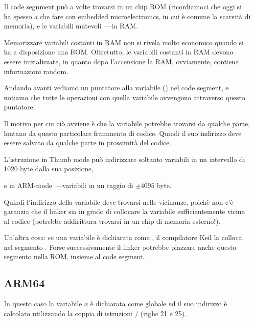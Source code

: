 Il code segnment può a volte trovarsi in un chip \ac{ROM} (ricordiamoci che oggi si ha spesso a che fare con embedded microelectronics, in cui è comune la scarsità di memoria), e le variabili mutevoli~---in \ac{RAM}.

Memorizzare variabili costanti in RAM non si rivela molto economico quando si ha a disposizione una ROM.
Oltretutto, le variabili costanti in RAM devono essere inizializzate, in quanto dopo l'accensione la RAM, ovviamente, contiene informazioni random.


Andando avanti vediamo un puntatore alla variabile  () nel code segment, e notiamo che tutte le operazioni con quella variabile avvengono attraverso questo puntatore.

Il motivo per cui ciò avviene è che la variabile  potrebbe trovarsi da qualche parte, lontano da questo particolare frammento di codice. Quindi il suo indirizzo deve essere salvato da qualche parte in prossimità del codice.

L'istruzione  in Thumb mode può indirizzare soltanto variabili in un intervallo di 1020 byte dalla sua posizione, 

e in ARM-mode~---variabili in un raggio di $\pm{}4095$ byte.

Quindi l'indirizzo della variabile  deve trovarsi nelle vicinanze, poichè non c'è garanzia che il linker sia in grado di collocare la variabile sufficientemente vicina al codice (potrebbe addirittura trovarsi in un chip di memoria esterno!).

\myindex{\ROM}

Un'altra cosa: se una variabile è dichiarata come , il compilatore Keil la colloca nel segmento .
Forse successivamente il linker potrebbe piazzare anche questo segmento nella ROM, insieme al code segment.

\subsection{ARM64}




In questo caso la variabile $x$ è dichiarata come globale ed il suo indirizzo è calcolato utilizzando la coppia di istruzioni 
/ (righe 21 e 25).

